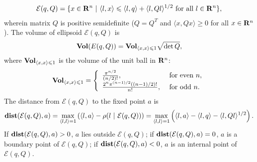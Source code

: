 \documentclass[letterpaper,10pt,english]{sphinxmanual}
\begin{document}
\label{chap_ellcalc:equation-ellipsoid2}\begin{gather}
\begin{split}{\mathcal E}(q,Q) = \{ x \in {\bf R}^n ~|~
\langle l,x\rangle\leqslant\langle l,q\rangle + \langle l,Ql\rangle^{1/2}
\mbox{ for all } l\in{\bf R}^n \},\end{split}\label{chap_ellcalc-ellipsoid2}
\end{gather}
wherein matrix $Q$ is positive semidefinite ($Q=Q^T$ and
$\langle x, Qx\rangle\geqslant0$ for all $x\in{\bf R}^n$).
The volume of ellipsoid ${\mathcal E}(q,Q)$ is
\label{chap_ellcalc:equation-ellvolume}\begin{gather}
\begin{split}{\bf Vol}(E(q,Q)) = {\bf Vol}_{\langle x,x\rangle\leqslant1}\sqrt{\det Q},\end{split}\label{chap_ellcalc-ellvolume}
\end{gather}
where ${\bf Vol}_{\langle x,x\rangle\leqslant1}$ is the volume of
the unit ball in ${\bf R}^n$:
\label{chap_ellcalc:equation-ellunitball}\begin{gather}
\begin{split}{\bf Vol}_{\langle x,x\rangle\leqslant1} = \left\{\begin{array}{ll}
\frac{\pi^{n/2}}{(n/2)!}, &
\mbox{ for even } n,\\
\frac{2^n\pi^{(n-1)/2}\left((n-1)/2\right)!}{n!}, &
\mbox{ for odd } n. \end{array}\right.\end{split}\label{chap_ellcalc-ellunitball}
\end{gather}
The distance from ${\mathcal E}(q,Q)$ to the fixed point $a$
is
\label{chap_ellcalc:equation-dist_point}\begin{gather}
\begin{split}{\bf dist}({\mathcal E}(q,Q),a) = \max_{\langle l,l\rangle=1}\left(\langle l,a\rangle -
\rho(l ~|~ {\mathcal E}(q,Q)) \right) =
\max_{\langle l,l\rangle=1}\left(\langle l,a\rangle - \langle l,q\rangle -
\langle l,Ql\rangle^{1/2}\right).\end{split}\label{chap_ellcalc-dist_point}
\end{gather}
If ${\bf dist}({\mathcal E}(q,Q),a) > 0$, $a$ lies outside
${\mathcal E}(q,Q)$; if
${\bf dist}({\mathcal E}(q,Q),a) = 0$, $a$ is a boundary
point of ${\mathcal E}(q,Q)$; if
${\bf dist}({\mathcal E}(q,Q),a) < 0$, $a$ is an internal
point of ${\mathcal E}(q,Q)$.
\end{document}
